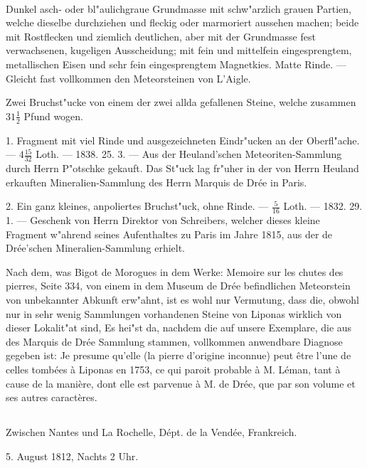 \documentclass[a4paper, 11pt, oneside, polutonikogreek, german]{article}
\begin{document}
\paragraph{}
Dunkel asch- oder bl"aulichgraue Grundmasse mit schw"arzlich grauen Partien, welche dieselbe durchziehen und fleckig oder marmoriert aussehen machen; beide mit Rostflecken und ziemlich deutlichen, aber mit der Grundmasse fest verwachsenen, kugeligen Ausscheidung; mit fein und mittelfein eingesprengtem, metallischen Eisen und sehr fein eingesprengtem Magnetkies. Matte Rinde. --- Gleicht fast vollkommen den Meteorsteinen von L'Aigle.

Zwei Bruchst"ucke von einem der zwei allda gefallenen Steine, welche zusammen $31\frac{1}{2}$ Pfund wogen.

1. Fragment mit viel Rinde und ausgezeichneten Eindr"ucken an der Oberfl"ache. --- $4\frac{15}{32}$ Loth. --- 1838. 25. 3. --- Aus der Heuland'schen Meteoriten-Sammlung durch Herrn P"otschke gekauft. Das St"uck lag fr"uher in der von Herrn Heuland erkauften Mineralien-Sammlung des Herrn Marquis de Drée in Paris.

2. Ein ganz kleines, anpoliertes Bruchst"uck, ohne Rinde. --- $\frac{5}{16}$ Loth. --- 1832. 29. 1. --- Geschenk von Herrn Direktor von Schreibers, welcher dieses kleine Fragment w"ahrend seines Aufenthaltes zu Paris im Jahre 1815, aus der de Drée'schen Mineralien-Sammlung erhielt.

\setlength{\leftskip}{10mm}
\setlength{\parindent}{0pt}

{\footnotesize Nach dem, was Bigot de Morogues in dem Werke: Memoire sur les chutes des pierres, Seite 334, von einem in dem Museum de Drée befindlichen Meteorstein von unbekannter Abkunft erw"ahnt, ist es wohl nur Vermutung, dass die, obwohl nur in sehr wenig Sammlungen vorhandenen Steine von Liponas wirklich von dieser Lokalit"at sind, Es hei"st da, nachdem die auf unsere Exemplare, die aus des Marquis de Drée Sammlung stammen, vollkommen anwendbare Diagnose gegeben ist: Je presume qu'elle (la pierre d'origine inconnue) peut être l'une de celles tombées à Liponas en 1753, ce qui paroit probable à M. Léman, tant à cause de la manière, dont elle est parvenue à M. de Drée, que par son volume et ses autres caractères.}

\setlength{\leftskip}{0pt}
\setlength{\parindent}{20pt}

\subsection{}
\begin{center}

Zwischen Nantes und La Rochelle, Dépt. de la Vendée, Frankreich.

5. August 1812, Nachts 2 Uhr.
\end{center}
\end{document}
